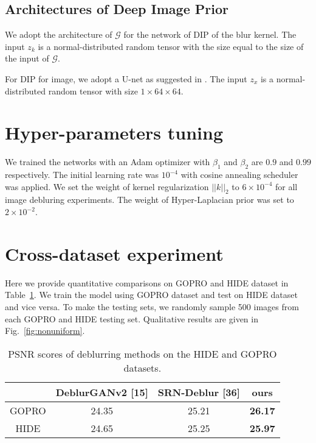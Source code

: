 \documentclass[final]{cvpr}
\newcommand{\Fref}[1]{Fig.~\ref{#1}}
\newcommand{\Tref}[1]{Table~\ref{#1}}
\begin{document}
\subsection{Architectures of Deep Image Prior}
We adopt the architecture of $\mathcal{G}$ for the network of DIP of the blur kernel. The input $z_k$ is a normal-distributed random tensor with the size equal to the size of the input of $\mathcal{G}$.

For DIP for image, we adopt a U-net \cite{ronneberger2015u} as suggested in \cite{ulyanov2018deep}. The input $z_x$ is a normal-distributed random tensor with size $1 \times 64 \times 64$.

\section{Hyper-parameters tuning}
We trained the networks with an Adam optimizer \cite{kingma2014adam} with $\beta_1$ and $\beta_2$ are $0.9$ and $0.99$ respectively. The initial learning rate was $10^{-4}$ with cosine annealing scheduler \cite{loshchilov2016sgdr} was applied. We set the weight of kernel regularization $||k||_2$ to $6 \times 10^{-4}$ for all image debluring experiments. The weight of Hyper-Laplacian prior \cite{krishnan2009fast} was set to $2 \times 10^{-2}$.

\section{Cross-dataset experiment}
Here we provide quantitative comparisons on GOPRO and HIDE dataset \cite{HAdeblur} in \Tref{tab:hideexp}. We train the model using GOPRO dataset and test on HIDE dataset and vice versa. To make the testing sets, we randomly sample 500 images from each GOPRO and HIDE testing set. Qualitative results are given in \Fref{fig:nonuniform}.

\setlength{\tabcolsep}{4pt}
\begin{table}[ht]
    \centering
    \begin{tabular}{cccc}
        \toprule
          & DeblurGANv2 [15] & SRN-Deblur [36] & ours\\
          \midrule
          GOPRO & 24.35 & 25.21 & \textbf{26.17}\\
          HIDE & 24.65 & 25.25 & \textbf{25.97}\\
         \bottomrule
    \end{tabular}
    \vskip 0.05in
    \caption{PSNR scores of deblurring methods on the HIDE and GOPRO datasets.}
    \vspace{-5mm}
    \label{tab:hideexp}
\end{table}
\end{document}
